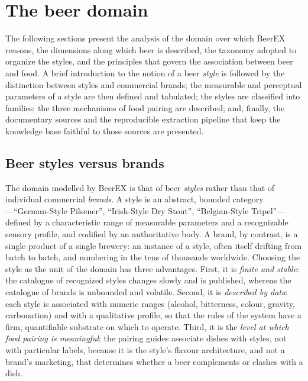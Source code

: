 \chapter{The beer domain}

The following sections present the analysis of the domain over which BeerEX
reasons, the dimensions along which beer is described, the taxonomy adopted to
organize the styles, and the principles that govern the association between beer
and food. A brief introduction to the notion of a beer \emph{style} is followed
by the distinction between styles and commercial brands; the measurable and
perceptual parameters of a style are then defined and tabulated; the styles are
classified into families; the three mechanisms of food pairing are described; and,
finally, the documentary sources and the reproducible extraction pipeline that
keep the knowledge base faithful to those sources are presented.

\section{Beer styles versus brands}

The domain modelled by BeerEX is that of beer \emph{styles} rather than that of
individual commercial \emph{brands}. A style is an abstract, bounded category
---``German-Style Pilsener'', ``Irish-Style Dry Stout'', ``Belgian-Style
Tripel''--- defined by a characteristic range of measurable parameters and a
recognizable sensory profile, and codified by an authoritative body. A brand, by
contrast, is a single product of a single brewery: an instance of a style, often
itself drifting from batch to batch, and numbering in the tens of thousands
worldwide. Choosing the style as the unit of the domain has three advantages.
First, it is \emph{finite and stable}: the catalogue of recognized styles changes
slowly and is published, whereas the catalogue of brands is unbounded and
volatile. Second, it is \emph{described by data}: each style is associated with
numeric ranges (alcohol, bitterness, colour, gravity, carbonation) and with a
qualitative profile, so that the rules of the system have a firm, quantifiable
substrate on which to operate. Third, it is the \emph{level at which food pairing
is meaningful}: the pairing guides associate dishes with styles, not with
particular labels, because it is the style's flavour architecture, and not a
brand's marketing, that determines whether a beer complements or clashes with a
dish.

